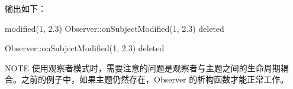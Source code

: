 输出如下：

\begin{shell}
modified(1, 2.3)
Observer::onSubjectModified(1, 2.3)
deleted

Observer::onSubjectModified(1, 2.3)
deleted
\end{shell}

\begin{myNotic}{NOTE}
使用观察者模式时，需要注意的问题是观察者与主题之间的生命周期耦合。之前的例子中，如果主题仍然存在，Observer 的析构函数才能正常工作。
\end{myNotic}





